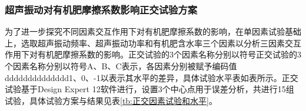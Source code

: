 \subsubsection{超声振动对有机肥摩擦系数影响正交试验方案}

为了进一步探究不同因素交互作用下对有机肥摩擦系数的影响，在单因素试验基础上，选取超声振动频率、超声振动功率和有机肥含水率三个因素以分析三因素交互作用下对有机肥摩擦系数的影响。正交试验的3个因素名称分别以符号正交试验的3个因素名称分别以符号A、B、C表示，各因素分别被赋予编码值dddddddddddddd1、0、-1以表示其水平的差异，具体试验水平表如表所示。正交试验基于Design Expert 12软件进行，设置3个中心点用于误差分析，共进行15组试验，具体试验方案与结果见表\ref{tb:正交因素试验和水平}。


